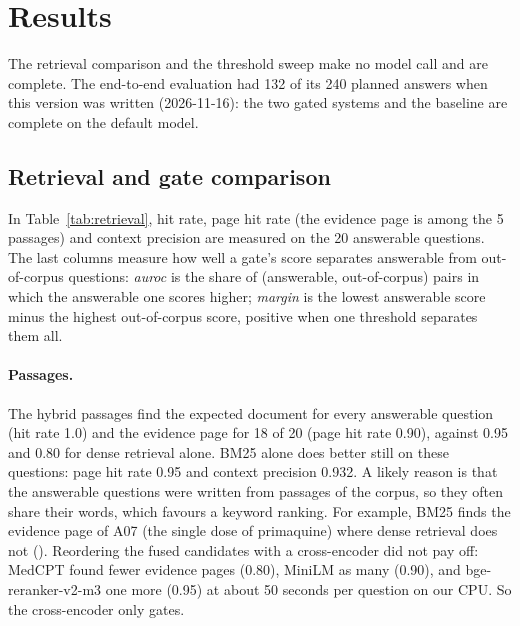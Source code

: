 \section{Results}
\label{sec:results}

The retrieval comparison and the threshold sweep make no model call and are complete. The end-to-end evaluation had 132 of its 240 planned answers when this version was written (2026-11-16): the two gated systems and the  baseline are complete on the default model.

\subsection{Retrieval and gate comparison}
\label{sec:retrieval-results}



In Table~\ref{tab:retrieval}, hit rate, page hit rate (the evidence page is among the 5 passages) and context precision are measured on the 20 answerable questions. The last columns measure how well a gate's score separates answerable from out-of-corpus questions: \emph{auroc} is the share of (answerable, out-of-corpus) pairs in which the answerable one scores higher; \emph{margin} is the lowest answerable score minus the highest out-of-corpus score, positive when one threshold separates them all.

\paragraph{Passages.} The hybrid passages find the expected document for every answerable question (hit rate 1.0) and the evidence page for 18 of 20 (page hit rate 0.90), against 0.95 and 0.80 for dense retrieval alone. BM25 alone does better still on these questions: page hit rate 0.95 and context precision 0.932. A likely reason is that the answerable questions were written from passages of the corpus, so they often share their words, which favours a keyword ranking. For example, BM25 finds the evidence page of A07 (the single dose of primaquine) where dense retrieval does not (). Reordering the fused candidates with a cross-encoder did not pay off: MedCPT found fewer evidence pages (0.80), MiniLM as many (0.90), and bge-reranker-v2-m3 one more (0.95) at about 50 seconds per question on our CPU. So the cross-encoder only gates.

